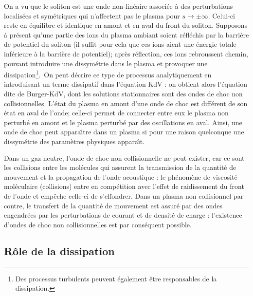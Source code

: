 \documentclass[10pt,thmsa]{article}
\begin{document}
On a vu que le soliton est une onde non-lin\'{e}aire associ\'{e}e \`{a} des
perturbations localis\'{e}es et sym\'{e}triques qui n'affectent pas le plasma
pour $s\rightarrow\pm\infty.$ Celui-ci reste en \'{e}quilibre et identique en
amont et en aval du front du soliton. Supposons \`{a} pr\'{e}sent qu'une
partie des ions du plasma ambiant soient r\'{e}fl\'{e}chis par la barri\`{e}re
de potentiel du soliton (il suffit pour cela que ces ions aient une
\'{e}nergie totale inf\'{e}rieure \`{a} la barri\`{e}re de potentiel);
apr\`{e}s r\'{e}flection, ces ions rebroussent chemin, pouvant introduire une
dissym\'{e}trie dans le plasma et provoquer une dissipation\footnote{Des
processus turbulents peuvent \'{e}galement \^{e}tre responsables de la
dissipation.}.\ On peut d\'{e}crire ce type de processus analytiquement en
introduisant un terme dissipatif dans l'\'{e}quation KdV : on obtient alors
l'\'{e}quation dite de Burger-KdV, dont les solutions stationnaires sont des
ondes de choc non collisionnelles. L'\'{e}tat du plasma en amont d'une onde de
choc est diff\'{e}rent de son \'{e}tat en aval de l'onde; celle-ci permet de
connecter entre eux le plasma non perturb\'{e} en amont et le plasma
perturb\'{e} par des oscillations en aval. Ainsi, une onde de choc peut
appara\^{\i}tre dans un plasma si pour une raison quelconque une
dissym\'{e}trie des param\`{e}tres physiques appara\^{\i}t.

Dans un gaz neutre, l'onde de choc non collisionnelle ne peut exister, car ce
sont les collisions entre les mol\'{e}cules qui assurent la transmission de la
quantit\'{e} de mouvement et la propagation de l'onde acoustique : le
ph\'{e}nom\`{e}ne de viscosit\'{e} mol\'{e}culaire (collisions) entre en
comp\'{e}tition avec l'effet de raidissement du front de l'onde et emp\^{e}che
celle-ci de s'effondrer. Dans un plasma non collisionnel par contre, le
transfert de la quantit\'{e} de mouvement est assur\'{e} par des ondes
engendr\'{e}es par les perturbations de courant et de densit\'{e} de charge :
l'existence d'ondes de choc non collisionnelles est par cons\'{e}quent possible.

\subsection{R\^{o}le de la dissipation}
\end{document}
